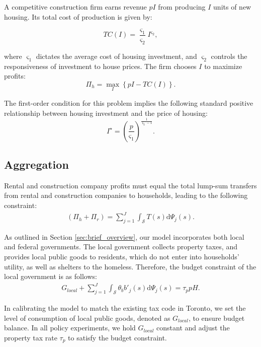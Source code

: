 \documentclass[parskip=full]{article}
\begin{document}
A competitive construction firm earns revenue $pI$ from producing $I$ units of new housing. Its total cost of production is given by:

\begin{equation*}\label{eq:total_cost_structure}
TC(I)=\frac{\varsigma_{1}}{\varsigma_{2}}I^{\varsigma_{2}},
\end{equation*}

\noindent where $\varsigma_{1}$ dictates the average cost of housing investment, and $\varsigma_{2}$ controls the responsiveness of investment to house prices. The firm chooses $I$ to maximize profits:
\begin{equation*}
\label{eq:construction_company_profits}
\Pi_h=\max_{I}\left\{pI-TC(I)\right\}.
\end{equation*}

\noindent The first-order condition for this problem implies the following standard positive relationship between housing investment and the price of housing:
\begin{equation}
\label{eq:construction_company_first_order_condition}
I^{\star}=\left(\frac{p}{\varsigma_{1}}\right)^{\frac{1}{\varsigma_{2}-1}}.
\end{equation}

\subsection{Aggregation}\label{subsection:aggregation}

Rental and construction company profits must equal the total lump-sum transfers from rental and construction companies to households, leading to the following constraint:
\begin{align}\label{eq:rebates}
   (\Pi_h+\Pi_r)=\sum_{j=1}^J \int_\mathcal{S} T(s)\mathrm{d}\Psi_j(s).
\end{align}

As outlined in Section \ref{sec:brief_overview}, our model incorporates both local and federal governments. The local government collects property taxes, and provides local public goods to residents, which do not enter into households' utility, as well as shelters to the homeless. Therefore, the budget constraint of the local government is as follows:
\begin{align}\label{eq:gbc_1}
  G_{local} +\sum_{j=1}^J \int_\mathcal{S} \theta_{b} b'_{j}(s)\mathrm{d}\Psi_j(s) = \tau_{p} p H.
\end{align}

\noindent In calibrating the model to match the existing tax code in Toronto, we set the level of consumption of local public goods, denoted as $G_{local}$, to ensure budget balance. In all policy experiments, we hold $G_{local}$ constant and adjust the property tax rate $\tau_{p}$ to satisfy the budget constraint.
\end{document}
